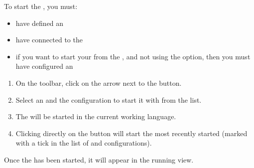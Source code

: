 


To start the \gdaut{}, you must:
\begin{itemize}
\item have defined an \gdaut{} 
\item have connected to the \gdagent{} 
\item if you want to start your \gdaut{} from the \ite{}, and not using the  option, then you must have configured an \gdaut{} 
\end{itemize}

\begin{enumerate}
\item On the toolbar, click on the arrow next to the  button. 
\item Select an \gdaut{} and the configuration to start it with from the list.
\item The \gdaut{} will be started in the current working language. 
 \item Clicking directly on the  button will start the most recently started \gdaut{} (marked with a tick in the list of \gdauts{} and configurations). 
 \end{enumerate}

Once the \gdaut{} has been started, it will appear in the running \gdauts{} view.




